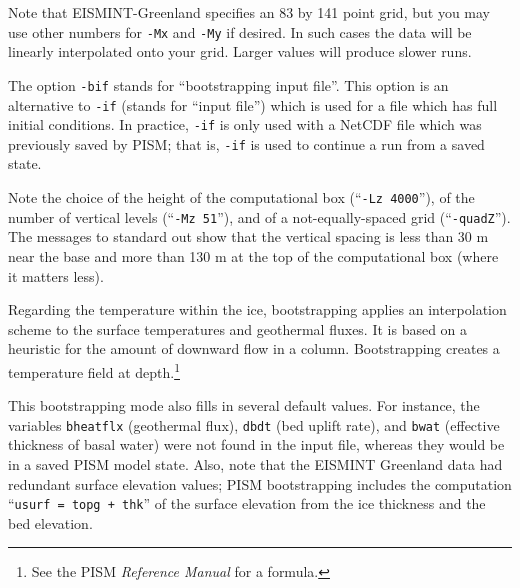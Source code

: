 \documentclass[11pt,final]{amsart}
\begin{document}
Note that EISMINT-Greenland specifies an 83 by 141 point grid, but you may use other numbers for \verb|-Mx| and \verb|-My| if desired.  In such cases the data will be linearly interpolated onto your grid.  Larger values will produce slower runs.

The option \verb|-bif| stands for ``bootstrapping input file''.  This option is an alternative to \verb|-if| (stands for ``input file'') which is used for a file which has full initial conditions.  In practice, \verb|-if| is only used with a NetCDF file which was previously saved by PISM; that is, \verb|-if| is used to continue a run from a saved state.

Note the choice of the height of the computational box (``\verb|-Lz 4000|''), of the number of vertical levels (``\verb|-Mz 51|''), and of a not-equally-spaced grid (``\verb|-quadZ|'').  The messages to standard out show that the vertical spacing is less than 30 m near the base and more than 130 m at the top of the computational box (where it matters less).

Regarding the temperature within the ice, bootstrapping applies an interpolation scheme to the surface temperatures and geothermal fluxes.  It is based on a heuristic for the amount of downward flow in a column.  Bootstrapping creates a temperature field at depth.\footnote{See the PISM \emph{Reference Manual} for a formula.}

This bootstrapping mode also fills in several default values.  For instance, the variables \verb|bheatflx| (geothermal flux), \verb|dbdt| (bed uplift rate), and \verb|bwat| (effective thickness of basal water) were not found in the input file, whereas they would be in a saved PISM model state.  Also, note that the EISMINT Greenland data had redundant surface elevation values; PISM bootstrapping includes the computation ``\verb|usurf = topg + thk|'' of the surface elevation from the ice thickness and the bed elevation.
\end{document}
